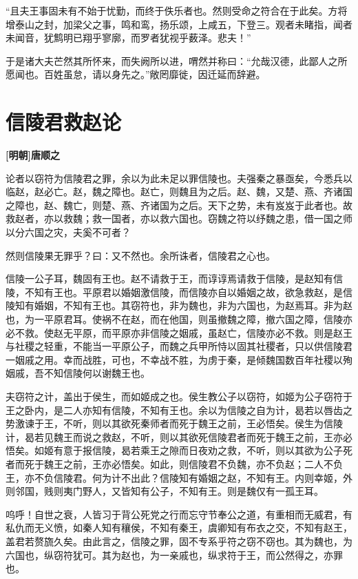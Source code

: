 \documentclass[UTF8,titlepage,oneside]{ctexbook}
\begin{document}
“且夫王事固未有不始于忧勤，而终于佚乐者也。然则受命之符合在于此矣。方将增泰山之封，加梁父之事，鸣和鸾，扬乐颂，上咸五，下登三。观者未睹指，闻者未闻音，犹鹪明已翔乎寥廓，而罗者犹视乎薮泽。悲夫！”


于是诸大夫芒然其所怀来，而失阙所以进，喟然并称曰：“允哉汉德，此鄙人之所愿闻也。百姓虽怠，请以身先之。”敞罔靡徙，因迁延而辞避。



\chapter*{信陵君救赵论}
\begin{center}
	\textbf{[明朝]唐顺之}
\end{center}

论者以窃符为信陵君之罪，余以为此未足以罪信陵也。夫强秦之暴亟矣，今悉兵以临赵，赵必亡。赵，魏之障也。赵亡，则魏且为之后。赵、魏，又楚、燕、齐诸国之障也，赵、魏亡，则楚、燕、齐诸国为之后。天下之势，未有岌岌于此者也。故救赵者，亦以救魏；救一国者，亦以救六国也。窃魏之符以纾魏之患，借一国之师以分六国之灾，夫奚不可者？

然则信陵果无罪乎？曰：又不然也。余所诛者，信陵君之心也。

信陵一公子耳，魏固有王也。赵不请救于王，而谆谆焉请救于信陵，是赵知有信陵，不知有王也。平原君以婚姻激信陵，而信陵亦自以婚姻之故，欲急救赵，是信陵知有婚姻，不知有王也。其窃符也，非为魏也，非为六国也，为赵焉耳。非为赵也，为一平原君耳。使祸不在赵，而在他国，则虽撤魏之障，撤六国之障，信陵亦必不救。使赵无平原，而平原亦非信陵之姻戚，虽赵亡，信陵亦必不救。则是赵王与社稷之轻重，不能当一平原公子，而魏之兵甲所恃以固其社稷者，只以供信陵君一姻戚之用。幸而战胜，可也，不幸战不胜，为虏于秦，是倾魏国数百年社稷以殉姻戚，吾不知信陵何以谢魏王也。

夫窃符之计，盖出于侯生，而如姬成之也。侯生教公子以窃符，如姬为公子窃符于王之卧内，是二人亦知有信陵，不知有王也。余以为信陵之自为计，曷若以唇齿之势激谏于王，不听，则以其欲死秦师者而死于魏王之前，王必悟矣。侯生为信陵计，曷若见魏王而说之救赵，不听，则以其欲死信陵君者而死于魏王之前，王亦必悟矣。如姬有意于报信陵，曷若乘王之隙而日夜劝之救，不听，则以其欲为公子死者而死于魏王之前，王亦必悟矣。如此，则信陵君不负魏，亦不负赵；二人不负王，亦不负信陵君。何为计不出此？信陵知有婚姻之赵，不知有王。内则幸姬，外则邻国，贱则夷门野人，又皆知有公子，不知有王。则是魏仅有一孤王耳。

呜呼！自世之衰，人皆习于背公死党之行而忘守节奉公之道，有重相而无威君，有私仇而无义愤，如秦人知有穰侯，不知有秦王，虞卿知有布衣之交，不知有赵王，盖君若赘旒久矣。由此言之，信陵之罪，固不专系乎符之窃不窃也。其为魏也，为六国也，纵窃符犹可。其为赵也，为一亲戚也，纵求符于王，而公然得之，亦罪也。
\end{document}
